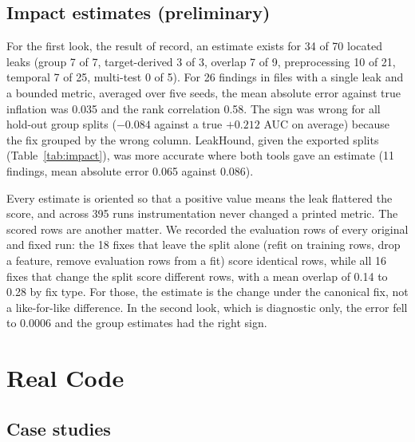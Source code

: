 \documentclass[10pt,a4paper,twocolumn]{article}
\begin{document}
\subsection{Impact estimates (preliminary)}

For the first look, the result of record, an estimate exists for 34 of 70 located leaks (group 7 of 7,
target-derived 3 of 3, overlap 7 of 9, preprocessing 10 of 21, temporal 7 of 25, multi-test 0 of 5). For 26 findings in files with a single leak and a
bounded metric, averaged over five seeds, the mean absolute error against true inflation was
0.035 and the rank correlation 0.58. The sign was wrong for all hold-out group splits ($-0.084$ against a true
$+0.212$ AUC on average) because the fix grouped by the wrong column. LeakHound, given the exported splits
(Table~\ref{tab:impact}), was more accurate where both tools gave an estimate (11 findings, mean absolute error
0.065 against 0.086).

Every estimate is oriented so that a positive value means the leak
flattered the score, and across 395 runs instrumentation never changed a printed metric. The scored rows are
another matter. We recorded the evaluation rows of every original and
fixed run: the 18 fixes that leave the split alone (refit on training rows, drop a feature, remove evaluation rows
from a fit) score identical rows, while all 16 fixes that change the split score different rows, with a mean
overlap of 0.14 to 0.28 by fix type. For those, the estimate is the change under the canonical fix, not a
like-for-like difference. In the second look, which is diagnostic only, the error fell to 0.0006 and the group
estimates had the right sign.

\begin{table}[t]
\caption{Impact estimates against true inflation (TEST, single-leak files, seed 0). Comp.: pipelines reporting
AUC or $R^2$. Cells: estimates (mean absolute error). LH: LeakHound; col.: true column named.}
\label{tab:impact}
\footnotesize
\setlength{\tabcolsep}{2.4pt}

\end{table}

\section{Real Code}
\label{sec:real}

\subsection{Case studies}
\end{document}
